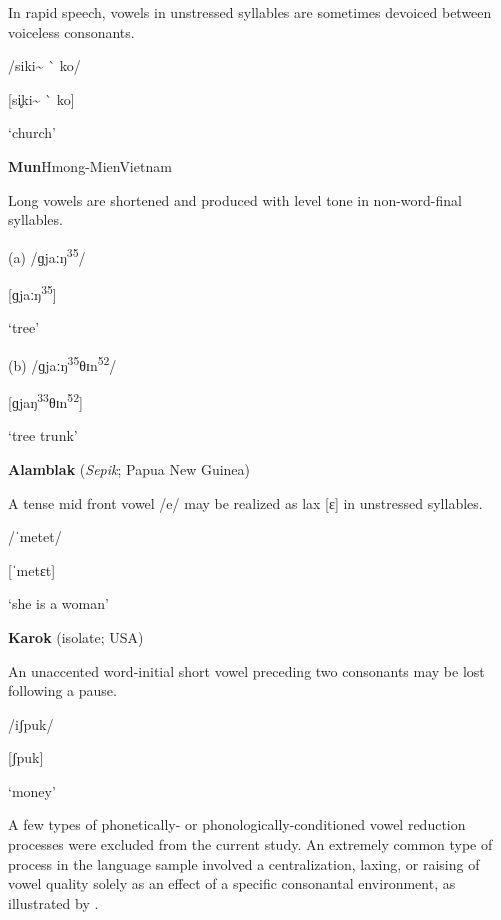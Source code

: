 \ea\label{ex:(6.6)}

In rapid speech, vowels in unstressed syllables are sometimes devoiced between voiceless consonants.

/siki\~{} \`{} ko/

[si̥ki\~{} \`{} ko]

\glt ‘church’

\citep[18]{Holt1999}

\z

\ea\label{ex:(6.7)}
 \textbf{Mun}{Hmong-Mien}{Vietnam}

Long vowels are shortened and produced with level tone in non-word-final syllables. 

(a)  /ɡjaːŋ\textsuperscript{35}/

[ɡjaːŋ\textsuperscript{35}]

\glt ‘tree’

(b)  /ɡjaːŋ\textsuperscript{35}θɪn\textsuperscript{52}/

[ɡjaŋ\textsuperscript{33}θɪn\textsuperscript{52}]

\glt ‘tree trunk’

\citep[117]{Clark2008}

\z

\ea\label{ex:(6.8)}
  \textbf{Alamblak} (\textit{Sepik}; Papua New Guinea)

A tense mid front vowel /e/ may be realized as lax [ɛ] in unstressed syllables.

/ˈmetet/

[ˈmetɛt]

\glt ‘she is a woman’

\citep[38]{Bruce1984}

\z

\ea\label{ex:(6.9)}
   \textbf{Karok} (isolate; USA)

An unaccented word-initial short vowel preceding two consonants may be lost following a pause. 

/iʃpuk/

[ʃpuk]

\glt ‘money’

\citep[53]{Bright1957}

\z

  A few types of phonetically- or phonologically-conditioned vowel reduction processes were excluded from the current study. An extremely common type of process in the language sample involved a centralization, laxing, or raising of vowel quality solely as an effect of a specific consonantal environment, as illustrated by .

